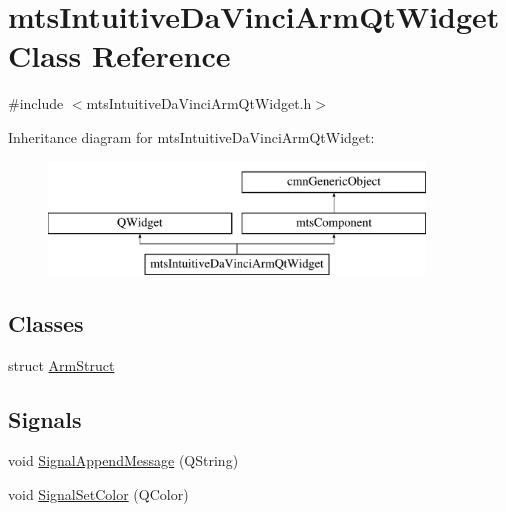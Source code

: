 \hypertarget{classmts_intuitive_da_vinci_arm_qt_widget}{}\section{mts\+Intuitive\+Da\+Vinci\+Arm\+Qt\+Widget Class Reference}
\label{classmts_intuitive_da_vinci_arm_qt_widget}


{\ttfamily \#include $<$mts\+Intuitive\+Da\+Vinci\+Arm\+Qt\+Widget.\+h$>$}

Inheritance diagram for mts\+Intuitive\+Da\+Vinci\+Arm\+Qt\+Widget\+:\begin{figure}[H]
\begin{center}
\leavevmode
\includegraphics[height=3.000000cm]{d8/d32/classmts_intuitive_da_vinci_arm_qt_widget}
\end{center}
\end{figure}
\subsection*{Classes}
\begin{DoxyCompactItemize}
\item 
struct \hyperlink{structmts_intuitive_da_vinci_arm_qt_widget_1_1_arm_struct}{Arm\+Struct}
\end{DoxyCompactItemize}
\subsection*{Signals}
\begin{DoxyCompactItemize}
\item 
void \hyperlink{classmts_intuitive_da_vinci_arm_qt_widget_af3fb1ebdbc74664a239145062c0311ad}{Signal\+Append\+Message} (Q\+String)
\item 
void \hyperlink{classmts_intuitive_da_vinci_arm_qt_widget_aefb4d032b945c18472d4f05c1d7b1130}{Signal\+Set\+Color} (Q\+Color)
\end{DoxyCompactItemize}
